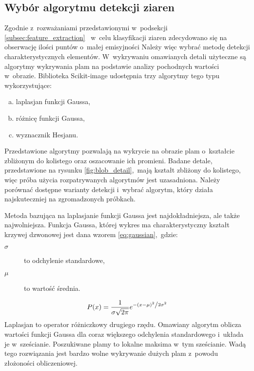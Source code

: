 \subsection{Wybór algorytmu detekcji ziaren}
\label{subsec:blob_detect}
Zgodnie z~rozważaniami przedstawionymi w~podsekcji
\ref{subsec:feature_extraction}~%
w~celu klasyfikacji ziaren zdecydowano się na obserwację ilości puntów o~małej
emisyjności
Należy więc wybrać metodę detekcji charakterystycznych elementów.
W~wykrywaniu omawianych detali użyteczne są algorytmy wykrywania plam na
podstawie analizy pochodnych wartości w~obrazie.
Biblioteka Scikit-image udostępnia trzy algorytmy tego typu wykorzystujące:
\begin{enumerate}[a)]
    \item laplasjan funkcji Gaussa,
    \item różnicę funkcji Gaussa,
    \item wyznacznik Hesjanu.
\end{enumerate}
Przedstawione algorytmy pozwalają na wykrycie na obrazie plam o~kształcie
zbliżonym do kolistego oraz oszacowanie ich promieni.
Badane detale, przedstawione na rysunku \ref{fig:blob_detail},~mają kształt
zbliżony do kolistego, więc próba użycia rozpatrywanych algorytmów jest
uzasadniona.
Należy porównać dostępne warianty detekcji i~wybrać algorytm, który działa
najskuteczniej na zgromadzonych próbkach.

Metoda bazująca na laplasjanie funkcji Gaussa jest najdokładniejsza, ale także
najwolniejsza.
Funkcja Gaussa, której wykres ma charakterystyczny kształt krzywej dzwonowej
jest dana wzorem \ref{eq:gaussian},~gdzie:
\begin{description}
    \item[$ \sigma $] to odchylenie standardowe,
    \item[$ \mu $] to wartość średnia.
\end{description}
\begin{equation}
    P(x) = \frac{1}{{\sigma \sqrt {2\pi } }}
    e^{{{ - \left( {x - \mu } \right)^2 }
    \mathord{\left/ {\vphantom {{ - \left( {x - \mu } \right)^2 }
            {2\sigma ^2 }}} \right. \kern-\nulldelimiterspace} {2\sigma ^2 }}}
    \label{eq:gaussian}
\end{equation}
Laplasjan to operator różniczkowy drugiego rzędu.
Omawiany algorytm oblicza wartości funkcji Gaussa dla coraz większego odchylenia
standardowego i~układa je w~sześcianie.
Poszukiwane plamy to lokalne maksima w~tym sześcianie.
Wadą tego rozwiązania jest bardzo wolne wykrywanie dużych plam z~powodu
złożoności obliczeniowej.

